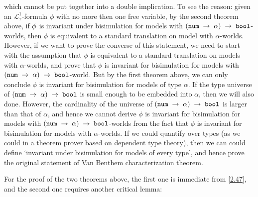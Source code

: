 \documentclass{llncs}
\renewcommand{\HOLinline}[1]{\ensuremath{#1}}
\begin{document}
which cannot be put together into a double implication. To see the reason: given an $\mathcal L_{\tau}^1$-formula $\phi$ with no more then one free variable, by the second theorem above, if \HOLinline{\HOLFreeVar{\ensuremath{\phi}}} is invariant under bisimulation for models with \HOLinline{(\HOLTyOp{num}\;\ensuremath{\rightarrow}\;\ensuremath{\alpha})\;\ensuremath{\rightarrow}\;\HOLTyOp{bool}}-worlds, then $\phi$ is equivalent to a standard translation on model with $\alpha$-worlds. However, if we want to prove the converse of this statement, we need to start with the assumption that $\phi$ is equivalent to a standard translation on models with $\alpha$-worlds, and prove that $\phi$ is invariant for bisimulation for models with \HOLinline{(\HOLTyOp{num}\;\ensuremath{\rightarrow}\;\ensuremath{\alpha})\;\ensuremath{\rightarrow}\;\HOLTyOp{bool}}-world. But by the first theorem above, we can only conclude $\phi$ is invariant for bisimulation for models of type $\alpha$. If the type universe of \HOLinline{(\HOLTyOp{num}\;\ensuremath{\rightarrow}\;\ensuremath{\alpha})\;\ensuremath{\rightarrow}\;\HOLTyOp{bool}} is small enough to be embedded into $\alpha$, then we will also done. However, the cardinality of the universe of \HOLinline{(\HOLTyOp{num}\;\ensuremath{\rightarrow}\;\ensuremath{\alpha})\;\ensuremath{\rightarrow}\;\HOLTyOp{bool}} is larger than that of $\alpha$, and hence we cannot derive $\phi$ is invariant for bisimulation for models with \HOLinline{(\HOLTyOp{num}\;\ensuremath{\rightarrow}\;\ensuremath{\alpha})\;\ensuremath{\rightarrow}\;\HOLTyOp{bool}}-worlds from the fact that  $\phi$ is invariant for bisimulation for models with $\alpha$-worlds. If we could quantify over types (as we could in a theorem prover based on dependent type theory), then we can could define `invariant under bisimulation for models of every type', and hence prove the original statement of Van Benthem characterization theorem.

For the proof of the two theorems above, the first one is immediate from \ref{2.47}, and the second one requires another critical lemma:
\end{document}
